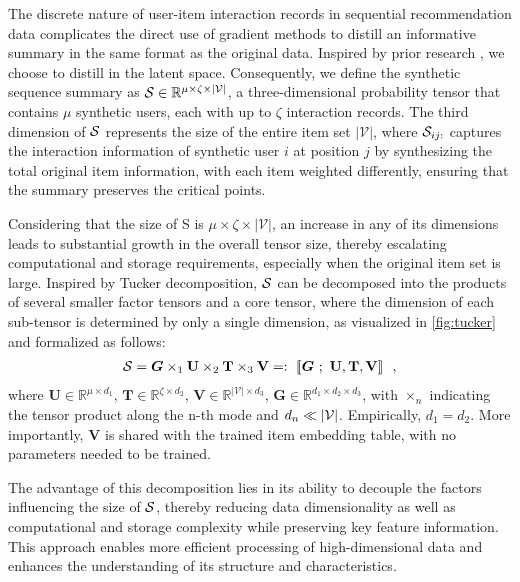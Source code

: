 The discrete nature of user-item interaction records in sequential recommendation data complicates the direct use of gradient methods to distill an informative summary in the same format as the original data. Inspired by prior research \cite{sachdeva2023farzi, li2021data, maekawa2023dataset}, we choose to distill in the latent space. Consequently, we define the synthetic sequence summary as $\mathcal{S} \in \mathbb{R}^{\mu \times \zeta \times |\mathcal{V}|}$, a three-dimensional probability tensor that contains $\mu$ synthetic users, each with up to $\zeta$ interaction records. The third dimension of $\mathcal{S}$ represents the size of the entire item set $|\mathcal{V}|$, where $\mathcal{S}_{ij:}$ captures the interaction information of synthetic user $i$ at position $j$ by synthesizing the total original item information, with each item weighted differently, ensuring that the summary preserves the critical points.

Considering that the size of S is $\mu \times \zeta \times |\mathcal{V}|$, an increase in any of its dimensions leads to substantial growth in the overall tensor size, thereby escalating computational and storage requirements, especially when the original item set is large. Inspired by Tucker decomposition, $\mathcal{S}$ can be decomposed into the products of several smaller factor tensors and a core tensor, where the dimension of each sub-tensor is determined by only a single dimension, as visualized in \cref{fig:tucker} and formalized as follows:
\begin{equation} \label{eq7}
    \begin{gathered}
        \mathcal{S} = \boldsymbol{G} \times_{1} \mathbf{U} \times_{2} \mathbf{T} \times_{3} \mathbf{V} =: ~\llbracket \boldsymbol{G} ~;~ \mathbf{U}, \mathbf{T}, \mathbf{V} \rrbracket ~~,
    \end{gathered}
\end{equation}
where $\mathbf{U} \in \mathbb{R}^{\mu \times d_1}$, $\mathbf{T} \in \mathbb{R}^{\zeta \times d_2}$, $\mathbf{V} \in \mathbb{R}^{|\mathcal{V}| \times d_3}$, $\mathbf{G} \in \mathbb{R}^{d_1 \times d_2 \times d_3}$, with $\times_n$ indicating the tensor product along the n-th mode and $d_n \ll |\mathcal{V}|$. Empirically, $d_1 = d_2$. More importantly, $\mathbf{V}$ is shared with the trained item embedding table, with no parameters needed to be trained. 

The advantage of this decomposition lies in its ability to decouple the factors influencing the size of $\mathcal{S}$, thereby reducing data dimensionality as well as computational and storage complexity while preserving key feature information. This approach enables more efficient processing of high-dimensional data and enhances the understanding of its structure and characteristics.





